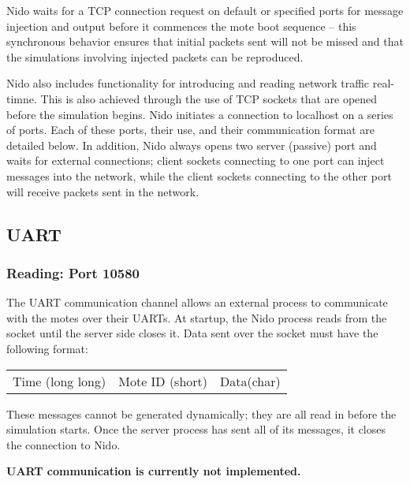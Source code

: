 \documentclass[10pt]{article}
\begin{document}
Nido waits for a TCP connection request on default or specified ports
for message injection and output before it commences the mote boot
sequence -- this synchronous behavior ensures that initial packets
sent will not be missed and that the simulations involving injected
packets can be reproduced.

Nido also includes functionality for introducing and reading network
traffic real-timne. This is also achieved through the use of TCP
sockets that are opened before the simulation begins. Nido initiates a
connection to localhost on a series of ports. Each of these ports,
their use, and their communication format are detailed below. In
addition, Nido always opens two server (passive) port and waits for
external connections; client sockets connecting to one port can inject
messages into the network, while the client sockets connecting to the
other port will receive packets sent in the network.

\subsection*{UART}

\subsubsection*{Reading: Port 10580}

The UART communication channel allows an external process to
communicate with the motes over their UARTs. At startup, the Nido
process reads from the socket until the server side closes it. Data
sent over the socket must have the following format:

\vspace{0.1in}
\begin{tabular}{|c|c|c|}\hline
\hspace{4in} & \hspace{1in} & \hspace{0.5in} \\ \hline
Time (long long)& Mote ID (short) & Data(char) \\ \hline
\end{tabular}
\vspace{0.1in}

These messages cannot be generated dynamically; they are all read in
before the simulation starts. Once the server process has sent all of
its messages, it closes the connection to Nido.

{\bf UART communication is currently not implemented.}
\end{document}
